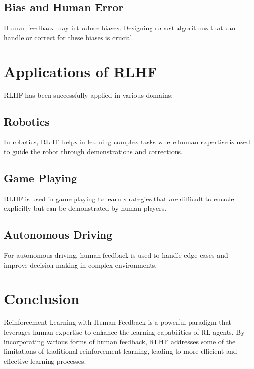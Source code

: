\subsection{Bias and Human Error}
Human feedback may introduce biases. Designing robust algorithms that can handle or correct for these biases is crucial.

\section{Applications of RLHF}
RLHF has been successfully applied in various domains:

\subsection{Robotics}
In robotics, RLHF helps in learning complex tasks where human expertise is used to guide the robot through demonstrations and corrections.

\subsection{Game Playing}
RLHF is used in game playing to learn strategies that are difficult to encode explicitly but can be demonstrated by human players.

\subsection{Autonomous Driving}
For autonomous driving, human feedback is used to handle edge cases and improve decision-making in complex environments.

\section{Conclusion}
Reinforcement Learning with Human Feedback is a powerful paradigm that leverages human expertise to enhance the learning capabilities of RL agents. By incorporating various forms of human feedback, RLHF addresses some of the limitations of traditional reinforcement learning, leading to more efficient and effective learning processes.


